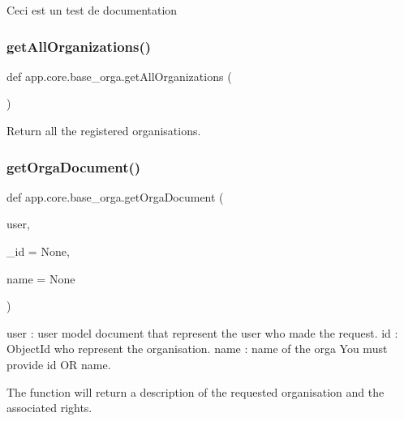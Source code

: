 \begin{DoxyVerb}Ceci est un test de documentation
\end{DoxyVerb}
 \mbox{\label{namespaceapp_1_1core_1_1base__orga_ad1d50f9c6e937bf46e72dfa1f6673eaa}} 
\subsubsection{\texorpdfstring{get\+All\+Organizations()}{getAllOrganizations()}}
{\footnotesize\ttfamily def app.\+core.\+base\+\_\+orga.\+get\+All\+Organizations (\begin{DoxyParamCaption}{ }\end{DoxyParamCaption})}

\begin{DoxyVerb}Return all the registered organisations.
\end{DoxyVerb}
 \mbox{\label{namespaceapp_1_1core_1_1base__orga_aed2475cedbcb473df07a6a37ff8193f3}} 
\subsubsection{\texorpdfstring{get\+Orga\+Document()}{getOrgaDocument()}}
{\footnotesize\ttfamily def app.\+core.\+base\+\_\+orga.\+get\+Orga\+Document (\begin{DoxyParamCaption}\item[{}]{user,  }\item[{}]{\+\_\+id = {\ttfamily None},  }\item[{}]{name = {\ttfamily None} }\end{DoxyParamCaption})}

\begin{DoxyVerb}user : user model document that represent the user who made the request.
id : ObjectId who represent the organisation.
name : name of the orga
You must provide id OR name.

The function will return a description of the requested organisation and the associated rights.
\end{DoxyVerb}
 \mbox{\label{namespaceapp_1_1core_1_1base__orga_a164bcc0870cbdc1a3648579c1a69180b}} 
